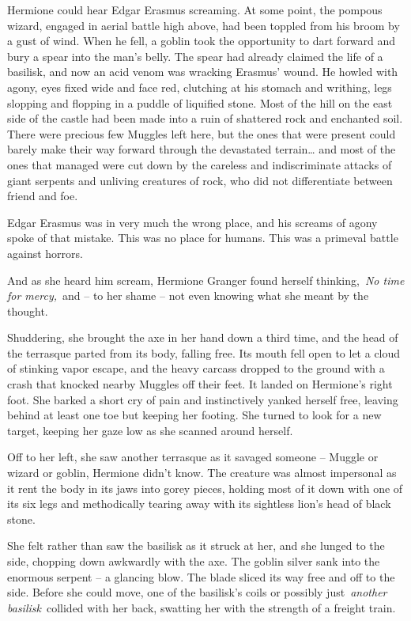 Hermione could hear Edgar Erasmus screaming. At some point, the pompous
wizard, engaged in aerial battle high above, had been toppled from his
broom by a gust of wind. When he fell, a goblin took the opportunity to
dart forward and bury a spear into the man's belly. The spear had
already claimed the life of a basilisk, and now an acid venom was
wracking Erasmus' wound. He howled with agony, eyes fixed wide and face
red, clutching at his stomach and writhing, legs slopping and flopping
in a puddle of liquified stone. Most of the hill on the east side of the
castle had been made into a ruin of shattered rock and enchanted soil.
There were precious few Muggles left here, but the ones that were
present could barely make their way forward through the devastated
terrain\ldots{} and most of the ones that managed were cut down by the
careless and indiscriminate attacks of giant serpents and unliving
creatures of rock, who did not differentiate between friend and foe.

Edgar Erasmus was in very much the wrong place, and his screams of agony
spoke of that mistake. This was no place for humans. This was a primeval
battle against horrors.

And as she heard him scream, Hermione Granger found herself
thinking,~\emph{No time for mercy,}~and -- to her shame -- not even
knowing what she meant by the thought.

Shuddering, she brought the axe in her hand down a third time, and the
head of the terrasque parted from its body, falling free. Its mouth fell
open to let a cloud of stinking vapor escape, and the heavy carcass
dropped to the ground with a crash that knocked nearby Muggles off their
feet. It landed on Hermione's right foot. She barked a short cry of pain
and instinctively yanked herself free, leaving behind at least one toe
but keeping her footing. She turned to look for a new target, keeping
her gaze low as she scanned around herself.

Off to her left, she saw another terrasque as it savaged someone --
Muggle or wizard or goblin, Hermione didn't know. The creature was
almost impersonal as it rent the body in its jaws into gorey pieces,
holding most of it down with one of its six legs and methodically
tearing away with its sightless lion's head of black stone.

She felt rather than saw the basilisk as it struck at her, and she
lunged to the side, chopping down awkwardly with the axe. The goblin
silver sank into the enormous serpent -- a glancing blow. The blade
sliced its way free and off to the side. Before she could move, one of
the basilisk's coils or possibly just~\emph{another basilisk}~collided
with her back, swatting her with the strength of a freight train.

